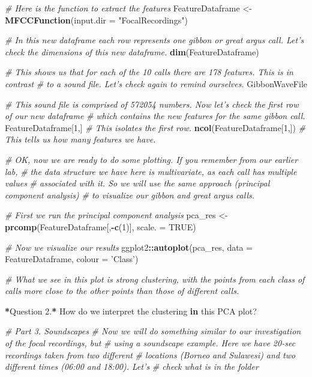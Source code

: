 \documentclass[]{book}
\newenvironment{Shaded}{\begin{snugshade}}{\end{snugshade}}
\newcommand{\CommentTok}[1]{\textcolor[rgb]{0.56,0.35,0.01}{\textit{#1}}}
\newcommand{\ControlFlowTok}[1]{\textcolor[rgb]{0.13,0.29,0.53}{\textbf{#1}}}
\newcommand{\DataTypeTok}[1]{\textcolor[rgb]{0.13,0.29,0.53}{#1}}
\newcommand{\DecValTok}[1]{\textcolor[rgb]{0.00,0.00,0.81}{#1}}
\newcommand{\FloatTok}[1]{\textcolor[rgb]{0.00,0.00,0.81}{#1}}
\newcommand{\KeywordTok}[1]{\textcolor[rgb]{0.13,0.29,0.53}{\textbf{#1}}}
\newcommand{\NormalTok}[1]{#1}
\newcommand{\OperatorTok}[1]{\textcolor[rgb]{0.81,0.36,0.00}{\textbf{#1}}}
\newcommand{\OtherTok}[1]{\textcolor[rgb]{0.56,0.35,0.01}{#1}}
\newcommand{\StringTok}[1]{\textcolor[rgb]{0.31,0.60,0.02}{#1}}
\begin{document}
\begin{Shaded}
\begin{Highlighting}[]
\CommentTok{# Here is the function to extract the features}
\NormalTok{FeatureDataframe <-}\StringTok{ }\KeywordTok{MFCCFunction}\NormalTok{(}\DataTypeTok{input.dir =} \StringTok{"FocalRecordings"}\NormalTok{)}

\CommentTok{# In this new dataframe each row represents one gibbon or great argus call. Let's check the dimensions of this new dataframe.}
\KeywordTok{dim}\NormalTok{(FeatureDataframe)}

\CommentTok{# This shows us that for each of the 10 calls there are 178 features. This is in contrast}
\CommentTok{# to a sound file. Let's check again to remind ourselves.}
\NormalTok{GibbonWaveFile}

\CommentTok{# This sound file is comprised of 572054 numbers. Now let's check the first row of our new dataframe}
\CommentTok{# which contains the new features for the same gibbon call.}
\NormalTok{FeatureDataframe[}\DecValTok{1}\NormalTok{,] }\CommentTok{# This isolates the first row.}
\KeywordTok{ncol}\NormalTok{(FeatureDataframe[}\DecValTok{1}\NormalTok{,]) }\CommentTok{# This tells us how many features we have.}

\CommentTok{# OK, now we are ready to do some plotting. If you remember from our earlier lab,}
\CommentTok{# the data structure we have here is multivariate, as each call has multiple values}
\CommentTok{# associated with it. So we will use the same approach (principal component analysis)}
\CommentTok{# to visualize our gibbon and great argus calls. }

\CommentTok{# First we run the principal component analysis}
\NormalTok{pca_res <-}\StringTok{ }\KeywordTok{prcomp}\NormalTok{(FeatureDataframe[,}\OperatorTok{-}\KeywordTok{c}\NormalTok{(}\DecValTok{1}\NormalTok{)], }\DataTypeTok{scale. =} \OtherTok{TRUE}\NormalTok{)}

\CommentTok{# Now we visualize our results}
\NormalTok{ggplot2}\OperatorTok{::}\KeywordTok{autoplot}\NormalTok{(pca_res, }\DataTypeTok{data =}\NormalTok{ FeatureDataframe,}
         \DataTypeTok{colour =} \StringTok{'Class'}\NormalTok{)}

\CommentTok{# What we see in this plot is strong clustering, with the points from each class of calls more close to the other points than those of different calls.}

\OperatorTok{*}\NormalTok{Question }\FloatTok{2.}\OperatorTok{*}\StringTok{ }\NormalTok{How do we interpret the clustering }\ControlFlowTok{in}\NormalTok{ this PCA plot?}
  
\CommentTok{# Part 3. Soundscapes}
\CommentTok{# Now we will do something similar to our investigation of the focal recordings, but}
\CommentTok{# using a soundscape example. Here we have 20-sec recordings taken from two different}
\CommentTok{# locations (Borneo and Sulawesi) and two different times (06:00 and 18:00). Let's}
\CommentTok{# check what is in the folder}


\end{Highlighting}
\end{Shaded}
\end{document}
